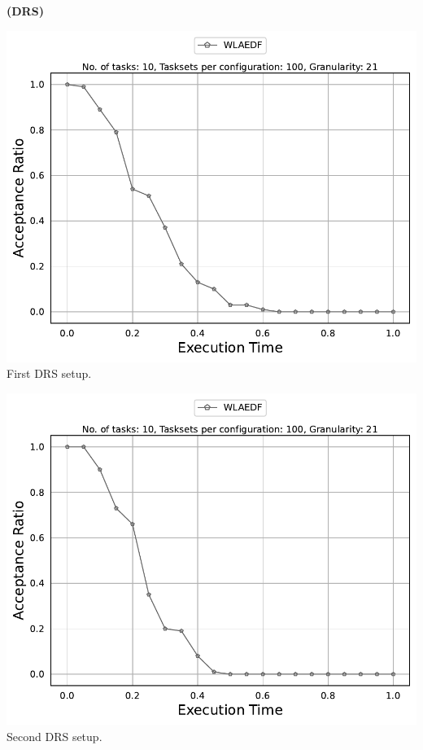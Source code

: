 \documentclass[]{article}
\begin{document}
	\begin{minipage}[t]{0.48\linewidth}
		\centering
		\textbf{(DRS)}
		\vspace{0.3cm}
		
		\includegraphics[width=\linewidth]{WLAEDF_1stSetup_DRS.pdf}
		First DRS setup.
		\vspace{0.3cm}
		
		\includegraphics[width=\linewidth]{WLAEDF_2ndSetup_DRS.pdf}
		Second DRS setup.
		\vspace{0.3cm}
		

\end{minipage}
\end{document}
